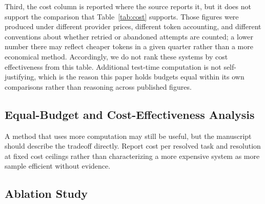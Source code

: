 \documentclass[journal]{IEEEtran}
\newcommand{\swebench}{\textsc{SWE-bench}}
\begin{document}
Third, the cost column is reported where the source reports it, but it does not support the comparison that Table~\ref{tab:cost} supports. Those figures were produced under different provider prices, different token accounting, and different conventions about whether retried or abandoned attempts are counted; a lower number there may reflect cheaper tokens in a given quarter rather than a more economical method. Accordingly, we do not rank these systems by cost effectiveness from this table. Additional test-time computation is not self-justifying, which is the reason this paper holds budgets equal within its own comparisons rather than reasoning across published figures.

\begin{table}[t]
\centering
\caption{Published \swebench{} Lite results from prior work, for context only. Entries differ in model, budget, scaffold and harness version simultaneously, so no difference is attributed to a single cause and no significance test is applied. Leaderboard figures are self-reported and not independently reproduced. Cost is reproduced as reported by each source; a dash denotes a figure the source does not report.}
\label{tab:published}
\resizebox{\linewidth}{!}{}
\end{table}

\subsection{Equal-Budget and Cost-Effectiveness Analysis}

\begin{table}[t]
\centering
\caption{Resource use per attempted task for the four factorial arms in the supplied diagnostic run. Values are computed from the 50 task-level trajectories; the same 22 instances were aborted by the leakage guard in all four arms and therefore contribute zero post-abort model usage. Cost is median with interquartile range.}
\label{tab:cost}
\resizebox{\linewidth}{!}{}
\end{table}

A method that uses more computation may still be useful, but the manuscript should describe the tradeoff directly. Report cost per resolved task and resolution at fixed cost ceilings rather than characterizing a more expensive system as more sample efficient without evidence.

\subsection{Ablation Study}
\end{document}
